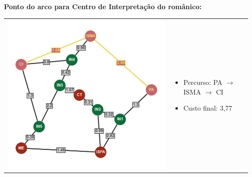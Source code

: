 \documentclass[12pt]{article}
\begin{document}
    \noindent \textbf{Ponto do arco para Centro de Interpretação do românico:}\\
    \begin{tabular}{@{}m{}m{}@{}}
      \centering\includegraphics[scale=0.4]{anexos/PA-CI.png} &
      \begin{itemize}
        \item Percurso: PA $\rightarrow$ ISMA $\rightarrow$ CI
        \item Custo final: 3,77
      \end{itemize}
    \end{tabular} 
    
    \newpage
    
\end{document}
